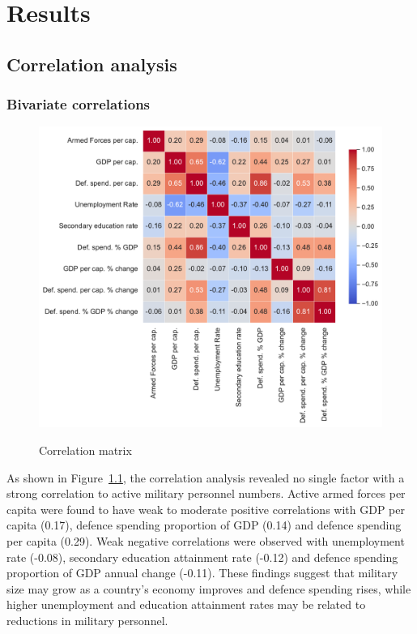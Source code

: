 \chapter{Results}

\section{Correlation analysis}

\subsection{Bivariate correlations}

\begin{figure}[htbp]
    \caption{Correlation matrix}
    \centering
    \includegraphics[width=1\textwidth]{images/correlation_heatmap.pdf}
    \label{fig:correlation_heatmap}
\end{figure}

As shown in Figure~\ref{fig:correlation_heatmap}, the correlation analysis revealed no single factor with a strong correlation to active military personnel numbers.
Active armed forces per capita were found to have weak to moderate positive correlations with GDP per capita (0.17), defence spending proportion of GDP (0.14) and defence spending per capita (0.29).
Weak negative correlations were observed with unemployment rate (-0.08), secondary education attainment rate (-0.12) and defence spending proportion of GDP annual change (-0.11). 
These findings suggest that military size may grow as a country's economy improves and defence spending rises, while higher unemployment and education attainment rates may be related to reductions in military personnel.

